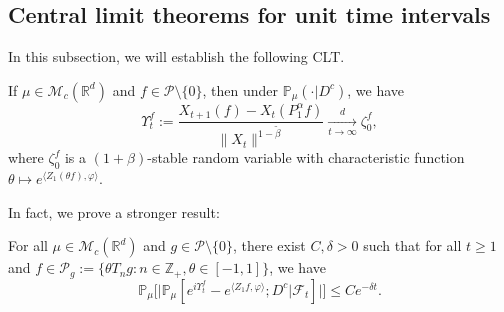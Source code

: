\documentclass[EJP]{ejpecp} %
\begin{document}
\subsection{Central limit theorems for unit time intervals}
\label{sec:critical}
	In this subsection, we will establish the following CLT.
\begin{theorem}
\label{lem:PR:LC}
	If  $\mu \in \mathcal M_c(\mathbb R^d)$ and $f\in \mathcal{P}\setminus \{0\}$, then  under $\mathbb{P}_{\mu}(\cdot | D ^c)$, we have
\begin{equation}
    \label{eq:PR:LC:1}
    \Upsilon^f_t
    := \frac{X_{t+1} (f) - X_t(P_1^\alpha f)}{\| X_t\|^{1-\tilde \beta}}
    \xrightarrow[t\to \infty]{d}\zeta^f_0,
\end{equation}
	where $\zeta^f_0$ is a $(1+\beta)$-stable random variable with characteristic function $\theta\mapsto e^{\langle Z_1(\theta f), \varphi\rangle}$.
\end{theorem}

	In fact, we prove a stronger result:

\begin{proposition}
\label{thm:Key}
	For all $\mu \in \mathcal M_c(\mathbb R^d)$ and $g \in \mathcal P \setminus \{0\}$, there exist $C,\delta>0$ such that for all $t\geq 1$ and $f \in \mathcal P_g:= \{\theta T_ng:n \in \mathbb Z_+, \theta \in [-1,1]\}$, we have
\[
    \mathbb P_\mu
    \Big[  \big|\mathbb P_\mu [e^{i\Upsilon^f_t} - e^{\langle Z_1f, \varphi\rangle}; D^c | \mathscr F_t ] \big |\Big]
    \leq C e^{- \delta t}.
\]
\end{proposition}
\end{document}
